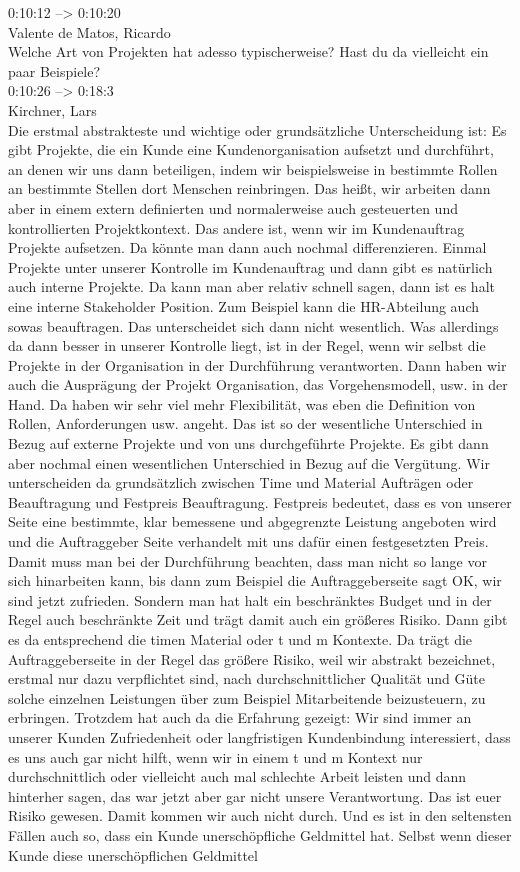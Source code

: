 0:10:12 --> 0:10:20\\
Valente de Matos, Ricardo\\
Welche Art von Projekten hat adesso typischerweise? Hast du da vielleicht ein paar Beispiele?\\

0:10:26 --> 0:18:3\\
Kirchner, Lars\\
Die erstmal abstrakteste und wichtige oder grundsätzliche Unterscheidung ist: Es gibt Projekte, die ein Kunde eine Kundenorganisation aufsetzt und durchführt, an denen wir uns dann beteiligen, indem wir beispielsweise in bestimmte Rollen an bestimmte Stellen dort Menschen reinbringen. Das heißt, wir arbeiten dann aber in einem extern definierten und normalerweise auch gesteuerten und kontrollierten Projektkontext. Das andere ist, wenn wir im Kundenauftrag Projekte aufsetzen. Da könnte man dann auch nochmal differenzieren. Einmal Projekte unter unserer Kontrolle im Kundenauftrag und dann gibt es natürlich auch interne Projekte. Da kann man aber relativ schnell sagen, dann ist es halt eine interne Stakeholder Position. Zum Beispiel kann die HR-Abteilung auch sowas beauftragen. Das unterscheidet sich dann nicht wesentlich. Was allerdings da dann besser in unserer Kontrolle liegt, ist in der Regel, wenn wir selbst die Projekte in der Organisation in der Durchführung verantworten. Dann haben wir auch die Ausprägung der Projekt Organisation, das Vorgehensmodell, usw. in der Hand. Da haben wir sehr viel mehr Flexibilität, was eben die Definition von Rollen, Anforderungen usw. angeht. Das ist so der wesentliche Unterschied in Bezug auf externe Projekte und von uns durchgeführte Projekte. Es gibt dann aber nochmal einen wesentlichen Unterschied in Bezug auf die Vergütung. Wir unterscheiden da grundsätzlich zwischen Time und Material Aufträgen oder Beauftragung und Festpreis Beauftragung. Festpreis bedeutet, dass es von unserer Seite eine bestimmte, klar bemessene und abgegrenzte Leistung angeboten wird und die Auftraggeber Seite verhandelt mit uns dafür einen festgesetzten Preis. Damit muss man bei der Durchführung beachten, dass man nicht so lange vor sich hinarbeiten kann, bis dann zum Beispiel die Auftraggeberseite sagt OK, wir sind jetzt zufrieden. Sondern man hat halt ein beschränktes Budget und in der Regel auch beschränkte Zeit und trägt damit auch ein größeres Risiko. Dann gibt es da entsprechend die timen Material oder t und m Kontexte. Da trägt die Auftraggeberseite in der Regel das größere Risiko, weil wir abstrakt bezeichnet, erstmal nur dazu verpflichtet sind, nach durchschnittlicher Qualität und Güte solche einzelnen Leistungen über zum Beispiel Mitarbeitende beizusteuern, zu erbringen. Trotzdem hat auch da die Erfahrung gezeigt: Wir sind immer an unserer Kunden Zufriedenheit oder langfristigen Kundenbindung interessiert, dass es uns auch gar nicht hilft, wenn wir in einem t und m Kontext nur durchschnittlich oder vielleicht auch mal schlechte Arbeit leisten und dann hinterher sagen, das war jetzt aber gar nicht unsere Verantwortung. Das ist euer Risiko gewesen. Damit kommen wir auch nicht durch. Und es ist in den seltensten Fällen auch so, dass ein Kunde unerschöpfliche Geldmittel hat. Selbst wenn dieser Kunde diese unerschöpflichen Geldmittel 
